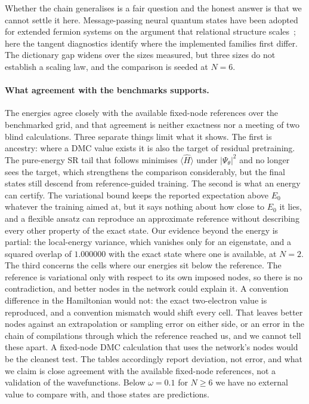 Whether the chain generalises is a fair question and the honest answer is that we cannot
settle it here. Message-passing neural quantum states have been adopted for extended fermion
systems on the argument that relational structure
scales~\cite{Pescia2024-MessagePassingNQS,KimEtAl2023-UltracoldFermiNQS}; here the tangent
diagnostics identify where the implemented families first differ. The dictionary gap widens
over the sizes measured, but three sizes do not establish a scaling law, and the comparison
is seeded at $N{=}6$.

\paragraph{What agreement with the benchmarks supports.}
\label{sec:energy-discussion}
The energies agree closely with the available fixed-node references over the benchmarked
grid, and that agreement is neither exactness nor a meeting of two blind calculations.
Three separate things limit what it shows. The first is ancestry: where a DMC value exists
it is also the target of residual pretraining. The pure-energy SR tail that follows
minimises $\langle\hat H\rangle$ under $|\Psi_\theta|^2$ and no longer sees the target, which
strengthens the comparison considerably, but the final states still descend from
reference-guided training. The second is what an energy can certify. The variational bound
keeps the reported expectation above $E_0$ whatever the training aimed at, but it says
nothing about how close to $E_0$ it lies, and a flexible ansatz can reproduce an approximate
reference without describing every other property of the exact state. Our evidence beyond
the energy is partial: the local-energy variance, which vanishes only for an eigenstate, and
a squared overlap of $1.000000$ with the exact state where one is available, at $N{=}2$. The
third concerns the cells where our energies sit below the reference. The reference is
variational only with respect to its own imposed nodes, so there is no contradiction, and
better nodes in the network could explain it. A convention difference in the Hamiltonian
would not: the exact two-electron value is reproduced, and a convention mismatch would shift
every cell. That leaves better nodes against an extrapolation or sampling error on either
side, or an error in the chain of compilations through which the reference reached us, and
we cannot tell these apart. A
fixed-node DMC calculation that uses the network's nodes would be the cleanest test. The
tables accordingly report deviation, not error, and what we claim is close agreement with the
available fixed-node references, not a validation of the wavefunctions. Below $\omega=0.1$
for $N\ge6$ we have no external value to compare with, and those states are predictions.

